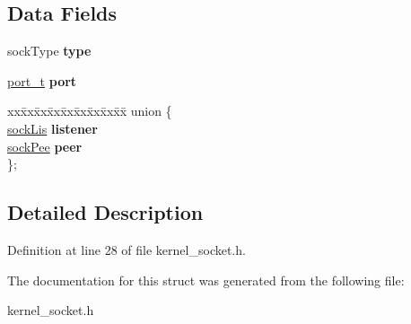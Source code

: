 \subsection*{Data Fields}
\begin{DoxyCompactItemize}
\item 
\mbox{\label{structsocket__control__block_ac6d17d5a98a0d59293b442f7d9570482}} 
sock\+Type {\bfseries type}
\item 
\mbox{\label{structsocket__control__block_a423683847ce85a4d78ea2830e3eb938d}} 
\hyperlink{group__syscalls_ga13894e5a2ffd5febb7aeb90e87239d61}{port\+\_\+t} {\bfseries port}
\item 
\mbox{\label{structsocket__control__block_a98fc55d0858a382e401fd850bc8c11ce}} 
\begin{tabbing}
xx\=xx\=xx\=xx\=xx\=xx\=xx\=xx\=xx\=\kill
union \{\\
\>\hyperlink{structlistener__socket}{sockLis} {\bfseries listener}\\
\>\hyperlink{structpeer__socket}{sockPee} {\bfseries peer}\\
\}; \\

\end{tabbing}\end{DoxyCompactItemize}


\subsection{Detailed Description}


Definition at line 28 of file kernel\+\_\+socket.\+h.



The documentation for this struct was generated from the following file\+:\begin{DoxyCompactItemize}
\item 
kernel\+\_\+socket.\+h\end{DoxyCompactItemize}
